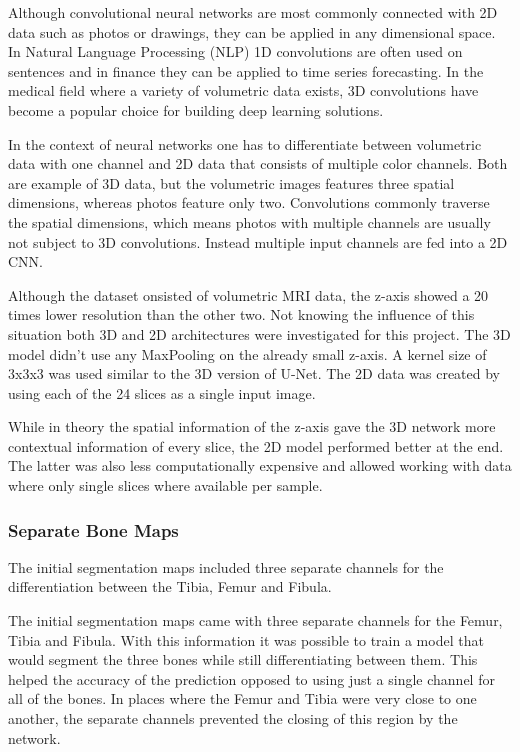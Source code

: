 Although convolutional neural networks are most commonly connected with 2D data such as photos or drawings, they can be applied in any dimensional space. In Natural Language Processing (NLP) 1D convolutions are often used on sentences and in finance they can be applied to time series forecasting. In the medical field where a variety of volumetric data exists, 3D convolutions have become a popular choice for building deep learning solutions.

In the context of neural networks one has to differentiate between volumetric data with one channel and 2D data that consists of multiple color channels. Both are example of 3D data, but the volumetric images features three spatial dimensions, whereas photos feature only two. Convolutions commonly traverse the spatial dimensions, which means photos with multiple channels are usually not subject to 3D convolutions. Instead multiple input channels are fed into a 2D CNN.

Although the dataset onsisted of volumetric MRI data, the z-axis showed a 20 times lower resolution than the other two. Not knowing the influence of this situation both 3D and 2D architectures were investigated for this project. The 3D model didn't use any MaxPooling on the already small z-axis. A kernel size of 3x3x3 was used similar to the 3D version of U-Net. The 2D data was created by using each of the 24 slices as a single input image. 

While in theory the spatial information of the z-axis gave the 3D network more contextual information of every slice, the 2D model performed better at the end. The latter was also less computationally expensive and allowed working with data where only single slices where available per sample.

\subsubsection{Separate Bone Maps}

The initial segmentation maps included three separate channels for the differentiation between the Tibia, Femur and Fibula. 

The initial segmentation maps came with three separate channels for the Femur, Tibia and Fibula. With this information it was possible to train a model that would segment the three bones while still differentiating between them. This helped the accuracy of the prediction opposed to using just a single channel for all of the bones. In places where the Femur and Tibia were very close to one another, the separate channels prevented the closing of this region by the network.

